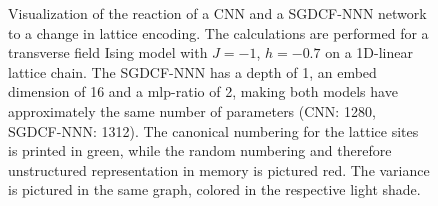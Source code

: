 
\begin{figure}[htbp]
    \centering
    \caption{
        Visualization of the reaction of a CNN and a SGDCF-NNN network to a change in lattice encoding.
        The calculations are performed for a transverse field Ising model with $J = -1$, $h=-0.7$ on a 1D-linear lattice chain.
        The SGDCF-NNN has a depth of 1, an embed dimension of 16 and a mlp-ratio of 2, making both models have approximately the same number of parameters (CNN: 1280, SGDCF-NNN: 1312).
        The canonical numbering for the lattice sites is printed in green, while the random numbering and therefore unstructured representation in memory is pictured red. 
        The variance is pictured in the same graph, colored in the respective light shade.
    }
    \label{fig:resiliency-encoding}
\end{figure}